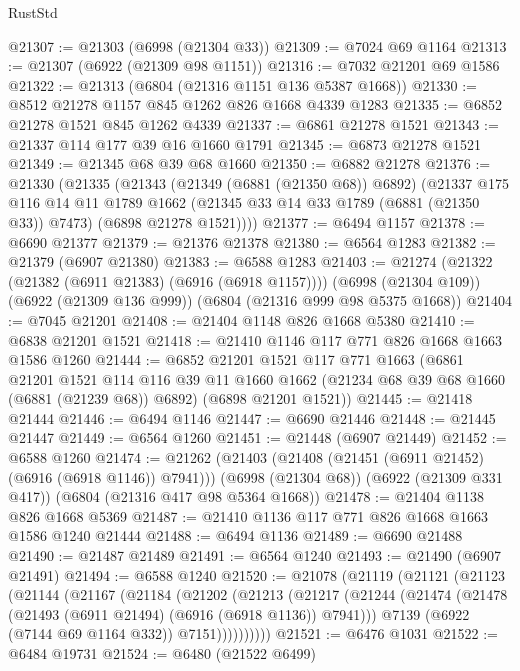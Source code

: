 \begin{lexlean}{RustStd}
\begin{coremodule}
@21307 := @21303 (@6998 (@21304 @33))
@21309 := @7024 @69 @1164
@21313 := @21307 (@6922 (@21309 @98 @1151))
@21316 := @7032 @21201 @69 @1586
@21322 := @21313 (@6804 (@21316 @1151 @136 @5387 @1668))
@21330 := @8512 @21278 @1157 @845 @1262 @826 @1668 @4339 @1283
@21335 := @6852 @21278 @1521 @845 @1262 @4339
@21337 := @6861 @21278 @1521
@21343 := @21337 @114 @177 @39 @16 @1660 @1791
@21345 := @6873 @21278 @1521
@21349 := @21345 @68 @39 @68 @1660
@21350 := @6882 @21278
@21376 := @21330
    (@21335
      (@21343
        (@21349 (@6881 (@21350 @68)) @6892)
        (@21337
          @175
          @116
          @14
          @11
          @1789
          @1662
          (@21345 @33 @14 @33 @1789 (@6881 (@21350 @33)) @7473)
          (@6898 @21278 @1521))))
@21377 := @6494 @1157
@21378 := @6690 @21377
@21379 := @21376 @21378
@21380 := @6564 @1283
@21382 := @21379 (@6907 @21380)
@21383 := @6588 @1283
@21403 := @21274
    (@21322 (@21382 (@6911 @21383) (@6916 (@6918 @1157))))
    (@6998 (@21304 @109))
    (@6922 (@21309 @136 @999))
    (@6804 (@21316 @999 @98 @5375 @1668))
@21404 := @7045 @21201
@21408 := @21404 @1148 @826 @1668 @5380
@21410 := @6838 @21201 @1521
@21418 := @21410 @1146 @117 @771 @826 @1668 @1663 @1586 @1260
@21444 := @6852
    @21201
    @1521
    @117
    @771
    @1663
    (@6861
      @21201
      @1521
      @114
      @116
      @39
      @11
      @1660
      @1662
      (@21234 @68 @39 @68 @1660 (@6881 (@21239 @68)) @6892)
      (@6898 @21201 @1521))
@21445 := @21418 @21444
@21446 := @6494 @1146
@21447 := @6690 @21446
@21448 := @21445 @21447
@21449 := @6564 @1260
@21451 := @21448 (@6907 @21449)
@21452 := @6588 @1260
@21474 := @21262
    (@21403 (@21408 (@21451 (@6911 @21452) (@6916 (@6918 @1146)) @7941)))
    (@6998 (@21304 @68))
    (@6922 (@21309 @331 @417))
    (@6804 (@21316 @417 @98 @5364 @1668))
@21478 := @21404 @1138 @826 @1668 @5369
@21487 := @21410 @1136 @117 @771 @826 @1668 @1663 @1586 @1240 @21444
@21488 := @6494 @1136
@21489 := @6690 @21488
@21490 := @21487 @21489
@21491 := @6564 @1240
@21493 := @21490 (@6907 @21491)
@21494 := @6588 @1240
@21520 := @21078
    (@21119
      (@21121
        (@21123
          (@21144
            (@21167
              (@21184
                (@21202
                  (@21213
                    (@21217
                      (@21244
                        (@21474 (@21478 (@21493 (@6911 @21494) (@6916 (@6918 @1136)) @7941)))
                        @7139
                        (@6922 (@7144 @69 @1164 @332))
                        @7151))))))))))
@21521 := @6476 @1031
@21522 := @6484 @19731
@21524 := @6480 (@21522 @6499)

\end{coremodule}
\end{lexlean}
